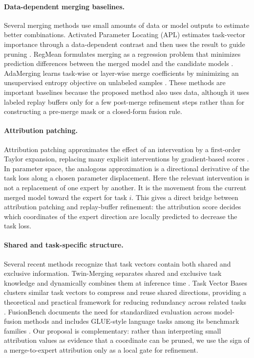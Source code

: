 \documentclass[11pt]{article}
\begin{document}
\paragraph{Data-dependent merging baselines.}
Several merging methods use small amounts of data or model outputs to estimate better combinations. Activated Parameter Locating (APL) estimates task-vector importance through a data-dependent contrast and then uses the result to guide pruning \citep{kong2024apl}. RegMean formulates merging as a regression problem that minimizes prediction differences between the merged model and the candidate models \citep{jin2023regmean}. AdaMerging learns task-wise or layer-wise merge coefficients by minimizing an unsupervised entropy objective on unlabeled samples \citep{yang2024adamerging}. These methods are important baselines because the proposed method also uses data, although it uses labeled replay buffers only for a few post-merge refinement steps rather than for constructing a pre-merge mask or a closed-form fusion rule.

\paragraph{Attribution patching.}
Attribution patching approximates the effect of an intervention by a first-order Taylor expansion, replacing many explicit interventions by gradient-based scores \citep{syed2024attributionpatching,kramar2024atpstar}. In parameter space, the analogous approximation is a directional derivative of the task loss along a chosen parameter displacement. Here the relevant intervention is not a replacement of one expert by another. It is the movement from the current merged model toward the expert for task $i$. This gives a direct bridge between attribution patching and replay-buffer refinement: the attribution score decides which coordinates of the expert direction are locally predicted to decrease the task loss.

\paragraph{Shared and task-specific structure.}
Several recent methods recognize that task vectors contain both shared and exclusive information. Twin-Merging separates shared and exclusive task knowledge and dynamically combines them at inference time \citep{lu2024twin}. Task Vector Bases clusters similar task vectors to compress and reuse shared directions, providing a theoretical and practical framework for reducing redundancy across related tasks \citep{zeng2025taskvectorbases}. FusionBench documents the need for standardized evaluation across model-fusion methods and includes GLUE-style language tasks among its benchmark families \citep{tang2024fusionbench}. Our proposal is complementary: rather than interpreting small attribution values as evidence that a coordinate can be pruned, we use the sign of a merge-to-expert attribution only as a local gate for refinement.
\end{document}
